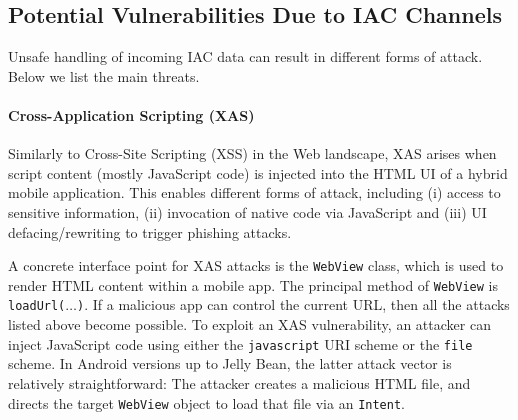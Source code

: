 
\subsection{Potential Vulnerabilities Due to IAC Channels}\label{Se:attackSurface}

Unsafe handling of incoming IAC data can result in different forms of attack. Below we list the main threats.

\paragraph{Cross-Application Scripting (XAS)} Similarly to Cross-Site Scripting (XSS) in the Web landscape, XAS arises when script content (mostly JavaScript code) is injected into the HTML UI of a hybrid mobile application. This enables different forms of attack, including (i) access to sensitive information, (ii) invocation of native code via JavaScript and (iii) UI defacing/rewriting to trigger phishing attacks.

A concrete interface point for XAS attacks is the {\tt WebView} class, which is used to render HTML content within a mobile app. The principal method of {\tt WebView} is {\tt loadUrl($\ldots$)}. If a malicious app can control the current URL, then all the attacks listed above become possible. 
%
To exploit an XAS vulnerability, an attacker can inject JavaScript code using either the {\tt javascript} URI scheme or the {\tt file} scheme. In Android versions up to Jelly Bean, the latter attack vector is relatively straightforward: The attacker creates a malicious HTML file, and directs the target {\tt WebView} object to load that file via an {\tt Intent}.
%

